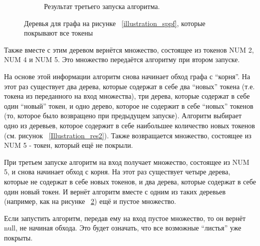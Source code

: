 \begin{figure}[h]
\begin{subfigure}[h]{0.25\textwidth}
        \caption{Результат третьего запуска алгоритма.}
        \label{Illustration_res3}
    \end{subfigure}
    \caption{Деревья для графа на рисунке ~\ref{illustration_sppf}, которые покрывают все токены}
\end{figure}

Также вместе с этим деревом вернётся множество, состоящее из токенов NUM 2, NUM 4 и NUM 5. Это множество передаётся алгоритму при втором запуске. 

На основе этой информации алгоритм снова начинает обход графа с “корня”. На этот раз существует два дерева, которые содержат в себе два “новых” токена (т.е. токена из переданного на вход множества), три дерева, которые содержат в себе один “новый” токен, и одно дерево, которое не содержит в себе “новых” токенов (то, которое было возвращено при предыдущем запуске). Алгоритм выбирает одно из деревьев, которое содержит в себе наибольшее количество новых токенов (см. рисунок ~\ref{Illustration_res2}). Также возвращается множество, состоящее из NUM 5 - токен, который ещё не покрыли. 

При третьем запуске алгоритм на вход получает множество, состоящее из NUM 5, и снова начинает обход с корня. На этот раз существует четыре дерева, которые не содержат в себе новых токенов, и два дерева, которые содержат в себе один новый токен. И вернёт алгоритм вместе с одним из таких деревьев (например, как на рисунке ~\ref{Illustration_res3}) ещё и пустое множество. 

Если запустить алгоритм, передав ему на вход пустое множество, то он вернёт null, не начиная обхода. Это будет означать, что все возможные “листья” уже покрыты. 